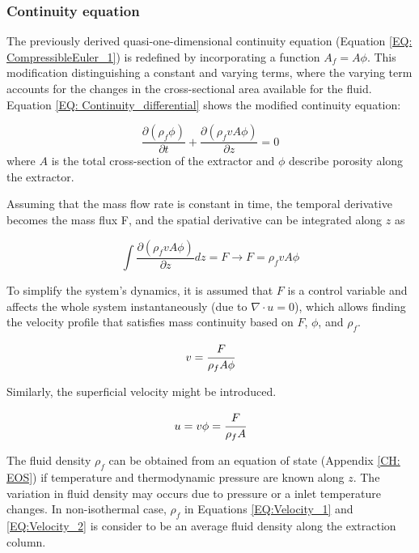 \documentclass[../Article_Model_Parameters.tex]{subfiles}
\begin{document}
		
	\subsubsection{Continuity equation} \label{CH: Continuity}
	
	The previously derived quasi-one-dimensional continuity equation (Equation \ref{EQ: CompressibleEuler_1}) is redefined by incorporating a function $A_f = A\phi$. This modification distinguishing a constant and varying terms, where the varying term accounts for the changes in the cross-sectional area available for the fluid. Equation \ref{EQ: Continuity_differential} shows the modified continuity equation:
	
	{\footnotesize
		\begin{equation} \label{EQ: Continuity_differential}
			\frac{\partial (\rho_f \phi)}{\partial t} + \frac{\partial (\rho_f v A\phi)}{\partial z} = 0
		\end{equation}
	}
	where $A$ is the total cross-section of the extractor and $\phi$ describe porosity along the extractor.
	
	Assuming that the mass flow rate is constant in time, the temporal derivative becomes the mass flux F, and the spatial derivative can be integrated along $z$ as
	
	{\footnotesize
		\begin{equation}
			\int \frac{\partial (\rho_f v A \phi )}{\partial z} dz = F \rightarrow F=\rho_f v A\phi
		\end{equation}
	}
	
	To simplify the system's dynamics, it is assumed that $F$ is a control variable and affects the whole system instantaneously (due to $\nabla \cdot u = 0$), which allows finding the velocity profile that satisfies mass continuity based on $F$, $\phi$, and $\rho_f$.
	
	{\footnotesize
	\begin{equation} \label{EQ:Velocity_1}
		v = \cfrac{F}{\rho_f A\phi} 
	\end{equation}
	}
	
	Similarly, the superficial velocity might be introduced.
	
	{\footnotesize
		\begin{equation} \label{EQ:Velocity_2}
			u = v \phi = \cfrac{F}{\rho_f A }
		\end{equation}
	}
	
	The fluid density $\rho_f$ can be obtained from an equation of state (Appendix \ref{CH: EOS}) if temperature and thermodynamic pressure are known along $z$. The variation in fluid density may occurs due to pressure or a inlet temperature changes. In non-isothermal case, $\rho_f$ in Equations \ref{EQ:Velocity_1} and \ref{EQ:Velocity_2} is consider to be an average fluid density along the extraction column.
		
\end{document}
